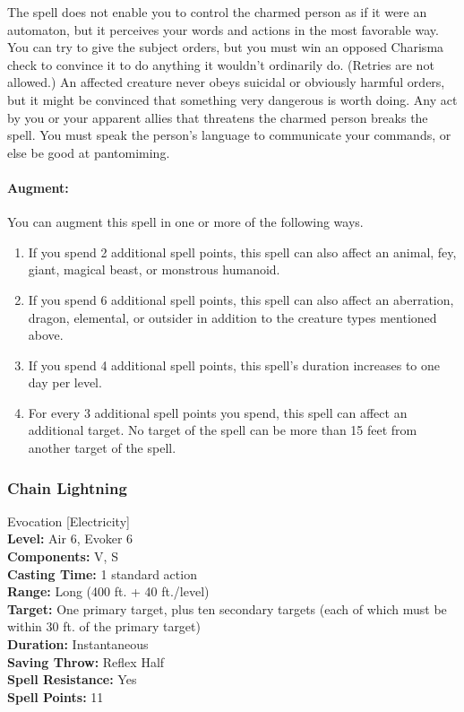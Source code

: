 The spell does not enable you to control the charmed person as if it were an automaton, 
but it perceives your words and actions in the most favorable way. You can try to give the subject orders, 
but you must win an opposed Charisma check to convince it to do anything it wouldn't ordinarily do. 
(Retries are not allowed.) An affected creature never obeys suicidal or obviously harmful orders, 
but it might be convinced that something very dangerous is worth doing. 
Any act by you or your apparent allies that threatens the charmed person breaks the spell. 
You must speak the person's language to communicate your commands, or else be good at pantomiming.

\paragraph{Augment:} You can augment this spell in one or more of the following ways.
\begin{enumerate}
 \item If you spend 2 additional spell points, this spell can also affect an animal, fey, giant, magical beast, or monstrous humanoid.
 \item If you spend 6 additional spell points, this spell can also affect an aberration, dragon, elemental, or outsider in addition to the creature types mentioned above.
 \item If you spend 4 additional spell points, this spell's duration increases to one day per level.
 \item For every 3 additional spell points you spend, this spell can affect an additional target. 
No target of the spell can be more than 15 feet from another target of the spell.
\end{enumerate}

\subsubsection{Chain Lightning}
\label{Spell:ChainLightning}
Evocation [Electricity]
\\ \textbf{Level:} Air 6, Evoker 6
\\ \textbf{Components:} V, S
\\ \textbf{Casting Time:} 1 standard action
\\ \textbf{Range:} Long (400 ft. + 40 ft./level)
\\ \textbf{Target:} One primary target, plus ten secondary targets (each of which must be within 30 ft. of the primary target)
\\ \textbf{Duration:} Instantaneous
\\ \textbf{Saving Throw:} Reflex Half
\\ \textbf{Spell Resistance:} Yes
\\ \textbf{Spell Points:} 11

